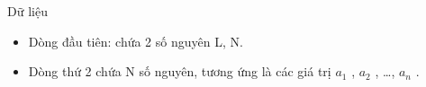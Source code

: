 Dữ liệu  
\begin{itemize}
	\item     Dòng đầu tiên: chứa 2 số nguyên L, N.   
	\item     Dòng thứ 2 chứa N số nguyên, tương ứng là các giá trị $a_{1}$    , $a_{2}$    , …, $a_{n}$    .   
\end{itemize}